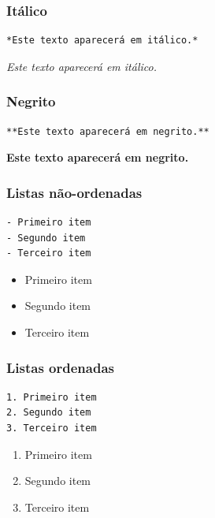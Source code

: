 \documentclass[10pt,a4paper]{book}
\providecommand{\tightlist}{%
  \setlength{\itemsep}{0pt}\setlength{\parskip}{0pt}}
\begin{document}
\subsubsection*{Itálico}\label{ituxe1lico}


\begin{verbatim}
*Este texto aparecerá em itálico.*
\end{verbatim}

\emph{Este texto aparecerá em itálico.}

\subsubsection*{Negrito}\label{negrito}


\begin{verbatim}
**Este texto aparecerá em negrito.**
\end{verbatim}

\textbf{Este texto aparecerá em negrito.}

\subsubsection*{Listas não-ordenadas}\label{listas-nuxe3o-ordenadas}


\begin{verbatim}
- Primeiro item
- Segundo item
- Terceiro item
\end{verbatim}

\begin{itemize}
\tightlist
\item
  Primeiro item
\item
  Segundo item
\item
  Terceiro item
\end{itemize}

\subsubsection*{Listas ordenadas}\label{listas-ordenadas}


\begin{verbatim}
1. Primeiro item
2. Segundo item
3. Terceiro item
\end{verbatim}

\begin{enumerate}
\def\labelenumi{\arabic{enumi}.}
\tightlist
\item
  Primeiro item
\item
  Segundo item
\item
  Terceiro item
\end{enumerate}
\end{document}
